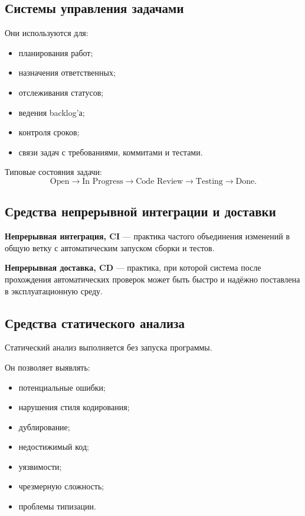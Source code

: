 \documentclass[12pt,a4paper]{article}
\begin{document}
\subsection{Системы управления задачами}

Они используются для:
\begin{itemize}
    \item планирования работ;
    \item назначения ответственных;
    \item отслеживания статусов;
    \item ведения backlog'а;
    \item контроля сроков;
    \item связи задач с требованиями, коммитами и тестами.
\end{itemize}

Типовые состояния задачи:
\[
\text{Open}
\rightarrow
\text{In Progress}
\rightarrow
\text{Code Review}
\rightarrow
\text{Testing}
\rightarrow
\text{Done}.
\]

\subsection{Средства непрерывной интеграции и доставки}

\textbf{Непрерывная интеграция, CI} --- практика частого объединения изменений в общую ветку с автоматическим запуском сборки и тестов.

\textbf{Непрерывная доставка, CD} --- практика, при которой система после прохождения автоматических проверок может быть быстро и надёжно поставлена в эксплуатационную среду.

\subsection{Средства статического анализа}

Статический анализ выполняется без запуска программы.

Он позволяет выявлять:
\begin{itemize}
    \item потенциальные ошибки;
    \item нарушения стиля кодирования;
    \item дублирование;
    \item недостижимый код;
    \item уязвимости;
    \item чрезмерную сложность;
    \item проблемы типизации.
\end{itemize}
\end{document}
